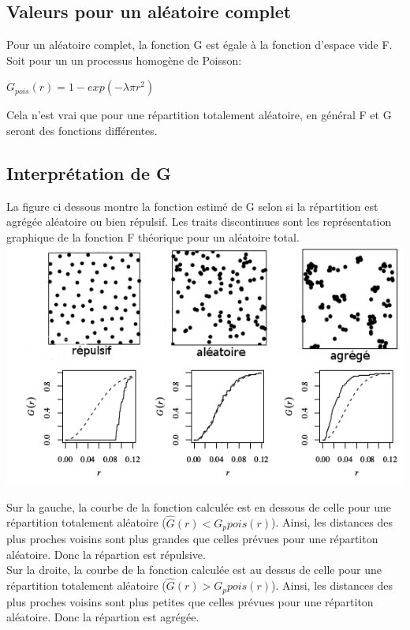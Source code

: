 \documentclass[french,12pt,a4paper]{report}
\begin{document}

\subsection{Valeurs pour un aléatoire complet}

Pour un aléatoire complet, la fonction G est égale à la fonction d'espace vide F. Soit pour un un processus homogène de Poisson: 
\begin{center}\begin{math} G_{pois}(r) = 1 - exp(-\lambda \pi r^2) \end{math}\end{center}
Cela n'est vrai que pour une répartition totalement aléatoire, en général F et G seront des fonctions différentes.\\


\subsection{Interprétation de G }
La figure ci dessous montre la fonction estimé de G selon si la répartition est agrégée aléatoire ou bien répulsif. Les traits discontinues sont les représentation graphique de la fonction F théorique pour un aléatoire total.\\

\includegraphics[scale=0.7]{images/interpret2.png}

Sur la gauche, la courbe de la fonction calculée est en dessous de celle pour une répartition totalement aléatoire (\begin{math}\hat{G}(r) < G_p{pois}(r) \end{math}). Ainsi, les distances des plus proches voisins sont plus grandes que celles prévues pour une répartiton aléatoire. Donc la répartion est répulsive.\\
\indent
Sur la droite, la courbe de la fonction calculée est au dessus de celle pour une répartition totalement aléatoire (\begin{math}\hat{G}(r) > G_p{pois}(r) \end{math}). Ainsi, les distances des plus proches voisins sont plus petites que celles prévues pour une répartiton aléatoire. Donc la répartion est agrégée.\\
\end{document}
